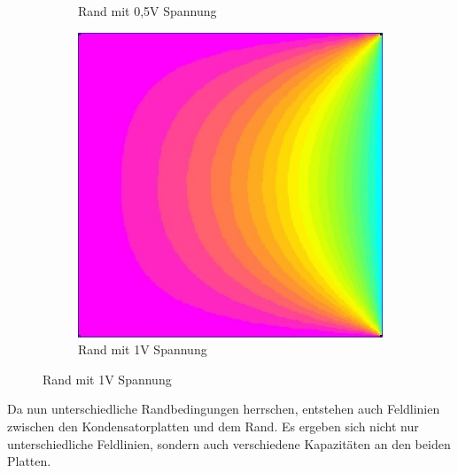 \begin{figure}[h]
\begin{subfigure}[c]{0.32\textwidth}
		\caption{Rand mit 0,5V Spannung}
		\label{fig:0,5V}
	\end{subfigure}
	\begin{subfigure}[c]{0.32\textwidth}
		\includegraphics[width=\textwidth]{data/1VRandbedingung}
		\caption{Rand mit 1V Spannung}
		\label{fig:1V}
	\end{subfigure}
\end{figure}

Da nun unterschiedliche Randbedingungen herrschen, entstehen auch Feldlinien zwischen den Kondensatorplatten und dem Rand. Es ergeben sich nicht nur unterschiedliche Feldlinien, sondern auch verschiedene Kapazitäten an den beiden Platten. 
\vspace*{1.5cm}

